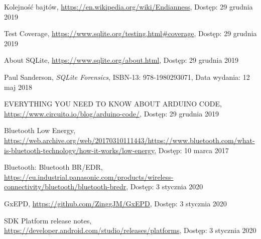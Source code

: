 \documentclass[a4paper,12pt, twoside]{article}
\begin{document}
\begin{thebibliography}{}
    		Kolejność bajtów,
    		\newline\url{https://en.wikipedia.org/wiki/Endianness}, 
    		\newline Dostęp: 29 grudnia 2019
    		
    		Test Coverage,
    		\newline\url{https://www.sqlite.org/testing.html#coverage}, 
    		\newline Dostęp: 29 grudnia 2019
    		
    		About SQLite,
    		\newline\url{https://www.sqlite.org/about.html}, 
    		\newline Dostęp: 29 grudnia 2019
    		
    	    Paul Sanderson, \textit{SQLite Forensics}, ISBN-13: 978-1980293071,
    		\newline Data wydania: 12 maj 2018
    		
    		EVERYTHING YOU NEED TO KNOW ABOUT ARDUINO CODE,
    		\newline\url{https://www.circuito.io/blog/arduino-code/}, 
    		\newline Dostęp: 29 grudnia 2019
    		
    		Bluetooth Low Energy,
    		\newline\url{https://web.archive.org/web/20170310111443/https://www.bluetooth.com/what-is-bluetooth-technology/how-it-works/low-energy}, 
    		\newline Dostęp: 10 marca 2017
    		
    		Bluetooth: Bluetooth BR/EDR,
    		\newline\url{https://eu.industrial.panasonic.com/products/wireless-connectivity/bluetooth/bluetooth-bredr}, 
    		\newline Dostęp: 3 stycznia 2020
    
    		GxEPD,
    		\newline\url{https://github.com/ZinggJM/GxEPD}, 
    		\newline Dostęp: 3 stycznia 2020
    		
    		SDK Platform release notes,
    		\newline\url{https://developer.android.com/studio/releases/platforms}, 
    		\newline Dostęp: 3 stycznia 2020
    		

\end{thebibliography}
\end{document}
